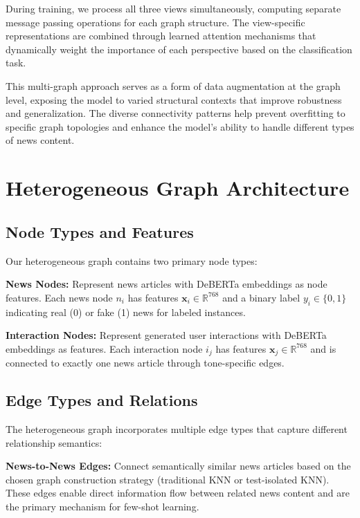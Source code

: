 During training, we process all three views simultaneously, computing separate message passing operations for each graph structure. The view-specific representations are combined through learned attention mechanisms that dynamically weight the importance of each perspective based on the classification task.

This multi-graph approach serves as a form of data augmentation at the graph level, exposing the model to varied structural contexts that improve robustness and generalization. The diverse connectivity patterns help prevent overfitting to specific graph topologies and enhance the model's ability to handle different types of news content.

\section{Heterogeneous Graph Architecture}

\subsection{Node Types and Features}

Our heterogeneous graph contains two primary node types:

\textbf{News Nodes:} Represent news articles with DeBERTa embeddings as node features. Each news node $n_i$ has features $\mathbf{x}_i \in \mathbb{R}^{768}$ and a binary label $y_i \in \{0, 1\}$ indicating real (0) or fake (1) news for labeled instances.

\textbf{Interaction Nodes:} Represent generated user interactions with DeBERTa embeddings as features. Each interaction node $i_j$ has features $\mathbf{x}_j \in \mathbb{R}^{768}$ and is connected to exactly one news article through tone-specific edges.

\subsection{Edge Types and Relations}

The heterogeneous graph incorporates multiple edge types that capture different relationship semantics:

\textbf{News-to-News Edges:} Connect semantically similar news articles based on the chosen graph construction strategy (traditional KNN or test-isolated KNN). These edges enable direct information flow between related news content and are the primary mechanism for few-shot learning.

